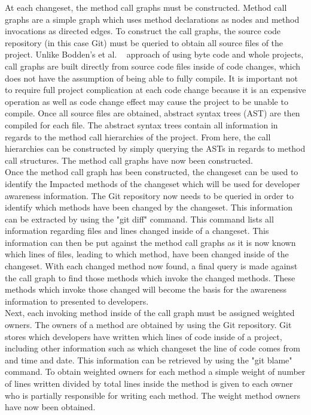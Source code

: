 \documentclass[conference]{IEEEtran}
\begin{document}
At each changeset, the method call graphs must be constructed. Method call graphs are a simple graph which uses
method declarations as nodes and method invocations as directed edges. To construct the call graphs, the source 
code repository (in this case Git) must be queried to obtain all source files of the project. Unlike Bodden's et al.
~\cite{Bodden:2003:HVJ}  approach of using byte code and whole projects, call graphs are built directly from source
code files inside of code changes, which does not have the assumption of being able to fully compile.
It is important not to require full project complication at each code change because it is an
expensive operation as well as code change effect may cause the project to be unable to compile.
Once all source files are
obtained, abstract syntax trees (AST) are then compiled for each file. The abstract syntax trees contain all information
in regards to the method call hierarchies of the project. From here, the call hierarchies can be constructed by simply
querying the ASTs in regards to method call structures. The method call graphs have now been constructed.\\

Once the method call graph has been constructed, the changeset can be used to identify the Impacted methods
of the changeset which will be used for developer awareness information. The Git repository now needs to be
queried in order to identify which methods have been changed by the changeset. This information can be 
extracted by using the "git diff" command. This command lists all information regarding files and lines
changed inside of a changeset. This information can then be put against the method call graphs as it is now 
known which lines of files, leading to which method, have been changed inside of the changeset. With each
changed method now found, a final query is made against the call graph to find those methods which invoke
the changed methods. These methods which invoke those changed will become the basis for the awareness
information to presented to developers. \\

Next, each invoking method inside of the call graph must be assigned weighted owners. The owners of a method are obtained
by using the Git repository. Git stores which developers have written which lines of code inside of a project, including
other information such as which changeset the line of code comes from and time and date. This information can be
retrieved by using the "git blame" command. To obtain weighted owners for each method a simple weight of number 
of lines written divided by total lines inside the method is given to each owner who is partially responsible for writing
each method. The weight method owners have now been obtained. \\
\end{document}
